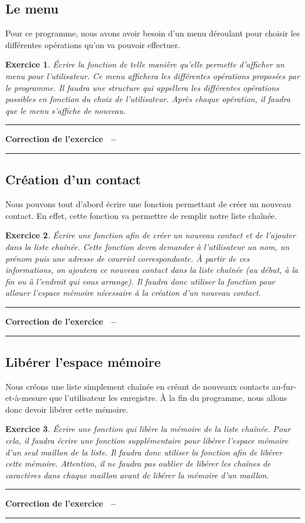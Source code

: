 \documentclass[a4paper]{article}
\newenvironment{Correction}{\par\tiny\blue\rule[1ex]{\textwidth}{1pt}\par\normalsize\textbf{Correction de l'exercice~\theExo{} -- }}{\par\tiny\blue\rule[1ex]{\textwidth}{1pt}\par}
\newtheorem{Exo}{Exercice}
\begin{document}
		\subsection{Le menu}
			Pour ce programme, nous avons avoir besoin d'un menu déroulant pour choisir les différentes opérations qu'on va pouvoir effectuer.
			\begin{Exo}
				Écrire la fonction  de telle manière qu'elle permette d'afficher un menu pour l'utilisateur.
				Ce menu affichera les différentes opérations proposées par le programme.
				Il faudra une structure  qui appellera les différentes opérations possibles en fonction du choix de l'utilisateur.
				Après chaque opération, il faudra que le menu s'affiche de nouveau.
			\end{Exo}
			\begin{Correction}
			\end{Correction}
		\subsection{Création d'un contact}
			Nous pouvons tout d'abord écrire une fonction permettant de créer un nouveau contact.
			En effet, cette fonction va permettre de remplir notre liste chaînée.
			\begin{Exo}
				Écrire une fonction afin de créer un nouveau contact et de l'ajouter dans la liste chaînée.
				Cette fonction devra demander à l'utilisateur un nom, un prénom puis une adresse de courriel correspondante.
				À partir de ces informations, on ajoutera ce nouveau contact dans la liste chaînée (au début, à la fin ou à l'endroit qui vous arrange).
				Il faudra donc utiliser la fonction  pour allouer l'espace mémoire nécessaire à la création d'un nouveau contact.
			\end{Exo}
			\begin{Correction}
			\end{Correction}
		\subsection{Libérer l'espace mémoire}
			Nous créons une liste simplement chaînée en créant de nouveaux contacts au-fur-et-à-mesure que l'utilisateur les enregistre.
			À la fin du programme, nous allons donc devoir libérer cette mémoire.
			\begin{Exo}
				Écrire une fonction qui libère la mémoire de la liste chaînée.
				Pour cela, il faudra écrire une fonction supplémentaire pour libérer l'espace mémoire d'un seul maillon de la liste.
			Il faudra donc utiliser la fonction  afin de libérer cette mémoire.
			Attention, il ne faudra pas oublier de libérer les chaînes de caractères dans chaque maillon avant de libérer la mémoire d'un maillon.
			\end{Exo}
			\begin{Correction}
			\end{Correction}
\end{document}
